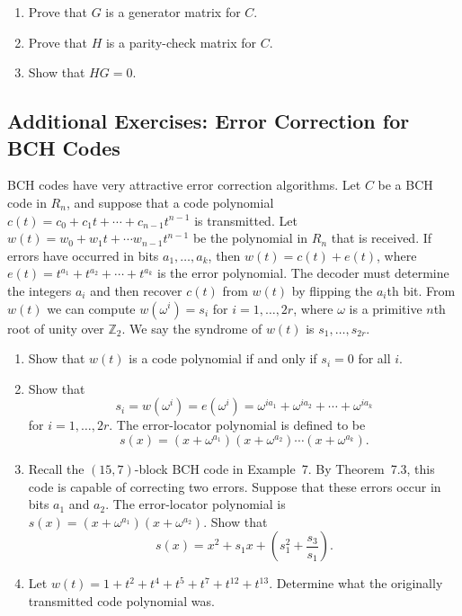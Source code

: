 {\begin{enumerate}
\begin{enumerate}
\bf\item\rm
Prove that $G$ is a generator matrix for $C$.

\bf\item\rm
Prove that $H$ is a parity-check matrix for $C$.


\bf\item\rm
Show that $HG = 0$.


\end{enumerate}







\end{enumerate}
}
 

 
\subsection*{Additional Exercises: Error Correction for BCH Codes}


{\small
BCH codes have very attractive error correction algorithms. Let $C$ be
a BCH code in $R_n$, and suppose that a code polynomial $c(t) = c_0 +
c_1 t + \cdots + c_{n-1} t^{n-1}$ is transmitted. Let $w(t) = w_0 +
w_1 t + \cdots w_{n-1} t^{n-1}$ be the polynomial in $R_n$ that is
received.  If errors have occurred in bits $a_1, \ldots, a_k$, then
$w(t) = c(t) + e(t)$, where $e(t) = t^{a_1} + t^{a_2} + \cdots +
t^{a_k}$ is the {\bfi error polynomial}. The
decoder must determine the integers $a_i$ and then recover $c(t)$ from
$w(t)$ by flipping the $a_i$th bit. From $w(t)$ we can compute
$w( \omega^i ) = s_i$ for $i = 1, \ldots, 2r$, where $\omega$ is a
primitive $n$th root of unity over ${\mathbb Z}_2$. We say the {\bfi
syndrome\/} of $w(t)$ is $s_1, \ldots,
s_{2r}$. 
\begin{enumerate}

\bf\item\rm
Show that $w(t)$ is a code polynomial if and only if $s_i = 0$ for all
$i$. 

\bf\item\rm
Show that 
$$
s_i = w( \omega^i) = e( \omega^i) = \omega^{i a_1} + \omega^{i a_2} +
\cdots + \omega^{i a_k} 
$$
for $i = 1, \ldots, 2r$. The {\bfi error-locator
polynomial\/} is defined to be 
$$
s(x) = (x + \omega^{a_1})(x + \omega^{a_2}) \cdots  (x +
\omega^{a_k}). 
$$

\bf\item\rm
Recall the $(15,7)$-block BCH code in Example~7.  By Theorem~7.3, this
code is capable of correcting two errors. Suppose that these errors
occur in bits $a_1$ and $a_2$. The error-locator polynomial
is $s(x) = (x + \omega^{a_1})(x + \omega^{a_2})$. Show that
$$
s(x) = x^2 + s_1 x + \left( s_1^2 + \frac{s_3}{s_1} \right).
$$


\bf\item\rm
Let $w(t) = 1 + t^2 +t^4 + t^5 + t^7 + t^{12} + t^{13}$. Determine
what the originally transmitted code polynomial was.

\end{enumerate}


}




